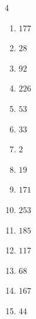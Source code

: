 \begin{multicols}{4}
\begin{enumerate}
  \item $177$


  \item $28$


  \item $92$


  \item $226$


  \item $53$


  \item $33$


  \item $2$


  \item $19$


  \item $171$


\columnbreak %

\resetques

  \item $253$


  \item $185$


  \item $117$


  \item $68$


  \item $167$


  \item $44$



\end{enumerate}
\end{multicols}
